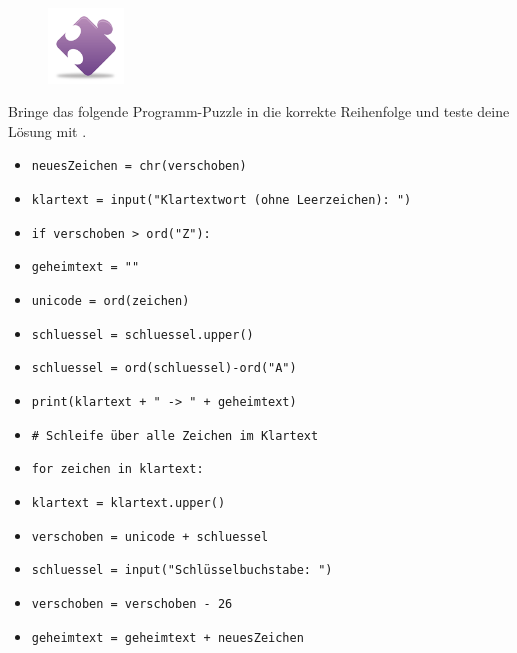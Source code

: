 \documentclass[11pt, a4paper, ngerman]{arbeitsblatt}
\begin{document}
\begin{aufgabe}
	\label{aufg:encode}
\begin{wrapfix}
\begin{figure}
	\includegraphics[width=2cm]{9Diff-AB.05-Abb_Puzzle}
\end{figure}

Bringe das folgende Programm-Puzzle in die korrekte Reihenfolge und
teste deine Lösung mit .

\end{wrapfix}

\begin{itemize}[label=\faPuzzlePiece]
    \item\texttt{neuesZeichen = chr(verschoben)}
    \item\texttt{klartext = input("Klartextwort (ohne Leerzeichen): ")}
    \item\texttt{if verschoben > ord("Z"):}
    \item\texttt{geheimtext = ""}
    \item\texttt{unicode = ord(zeichen)}
    \item\texttt{schluessel = schluessel.upper()}
    \item\texttt{schluessel = ord(schluessel)-ord("A")}
    \item\texttt{print(klartext + " -> " + geheimtext)}
    \item\texttt{# Schleife über alle Zeichen im Klartext}
    \item\texttt{for zeichen in klartext:}
    \item\texttt{klartext = klartext.upper()}
    \item\texttt{verschoben = unicode + schluessel}
    \item\texttt{schluessel = input("Schlüsselbuchstabe: ")}
    \item\texttt{verschoben = verschoben - 26}
    \item\texttt{geheimtext = geheimtext + neuesZeichen}
\end{itemize}
\end{aufgabe}
\end{document}
